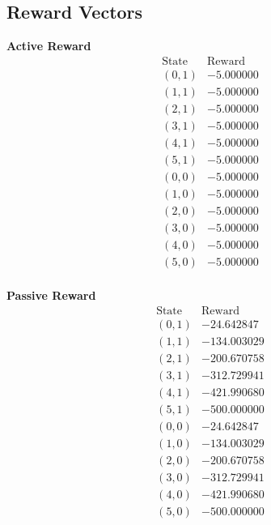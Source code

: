 \documentclass{article}
\begin{document}
\subsection*{Reward Vectors}

\begin{center}
\begin{minipage}[t]{0.45\linewidth}
\centering
\textbf{Active Reward}
\[
\begin{array}{c|c}
\text{State} & \text{Reward} \\\hline
(0,1) & -5.000000 \\
(1,1) & -5.000000 \\
(2,1) & -5.000000 \\
(3,1) & -5.000000 \\
(4,1) & -5.000000 \\
(5,1) & -5.000000 \\
(0,0) & -5.000000 \\
(1,0) & -5.000000 \\
(2,0) & -5.000000 \\
(3,0) & -5.000000 \\
(4,0) & -5.000000 \\
(5,0) & -5.000000 \\
\end{array}
\]
\end{minipage}
\hspace{1cm}
\begin{minipage}[t]{0.45\linewidth}
\centering
\textbf{Passive Reward}
\[
\begin{array}{c|c}
\text{State} & \text{Reward} \\\hline
(0,1) & -24.642847 \\
(1,1) & -134.003029 \\
(2,1) & -200.670758 \\
(3,1) & -312.729941 \\
(4,1) & -421.990680 \\
(5,1) & -500.000000 \\
(0,0) & -24.642847 \\
(1,0) & -134.003029 \\
(2,0) & -200.670758 \\
(3,0) & -312.729941 \\
(4,0) & -421.990680 \\
(5,0) & -500.000000 \\
\end{array}
\]
\end{minipage}
\end{center}
\end{document}
